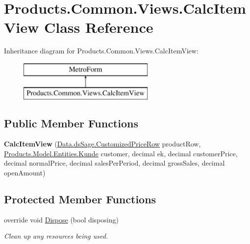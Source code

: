 \hypertarget{class_products_1_1_common_1_1_views_1_1_calc_item_view}{}\section{Products.\+Common.\+Views.\+Calc\+Item\+View Class Reference}
\label{class_products_1_1_common_1_1_views_1_1_calc_item_view}
Inheritance diagram for Products.\+Common.\+Views.\+Calc\+Item\+View\+:\begin{figure}[H]
\begin{center}
\leavevmode
\includegraphics[height=2.000000cm]{class_products_1_1_common_1_1_views_1_1_calc_item_view}
\end{center}
\end{figure}
\subsection*{Public Member Functions}
\begin{DoxyCompactItemize}
\item 
{\bfseries Calc\+Item\+View} (\hyperlink{class_products_1_1_data_1_1ds_sage_1_1_customized_price_row}{Data.\+ds\+Sage.\+Customized\+Price\+Row} product\+Row, \hyperlink{class_products_1_1_model_1_1_entities_1_1_kunde}{Products.\+Model.\+Entities.\+Kunde} customer, decimal ek, decimal customer\+Price, decimal normal\+Price, decimal sales\+Per\+Period, decimal gross\+Sales, decimal open\+Amount)\hypertarget{class_products_1_1_common_1_1_views_1_1_calc_item_view_ad8649a28e59c8098a71c7ba2a3e82c6a}{}\label{class_products_1_1_common_1_1_views_1_1_calc_item_view_ad8649a28e59c8098a71c7ba2a3e82c6a}

\end{DoxyCompactItemize}
\subsection*{Protected Member Functions}
\begin{DoxyCompactItemize}
\item 
override void \hyperlink{class_products_1_1_common_1_1_views_1_1_calc_item_view_a2d5d5e290f4ec7d612e551681e7b26cc}{Dispose} (bool disposing)
\begin{DoxyCompactList}\small\item\em Clean up any resources being used. \end{DoxyCompactList}\end{DoxyCompactItemize}


